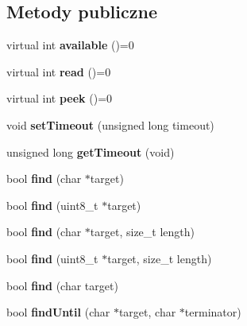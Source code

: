 \subsection*{Metody publiczne}
\begin{DoxyCompactItemize}
\item 
\mbox{\label{class_stream_a9c98a763395005c08ce95afb2f06c7b1}} 
virtual int {\bfseries available} ()=0
\item 
\mbox{\label{class_stream_aea5dee9fcb038148515b7c9212d38dc0}} 
virtual int {\bfseries read} ()=0
\item 
\mbox{\label{class_stream_a30c3c212ec6ea67277a708c5ea2501a5}} 
virtual int {\bfseries peek} ()=0
\item 
\mbox{\label{class_stream_a851dd6dc74d52389de04f99648478db5}} 
void {\bfseries set\+Timeout} (unsigned long timeout)
\item 
\mbox{\label{class_stream_abc982d9972a4c7fdabcf7ba9ab325ed1}} 
unsigned long {\bfseries get\+Timeout} (void)
\item 
\mbox{\label{class_stream_a4bab30ccd324efd461dee46a2339f673}} 
bool {\bfseries find} (char $\ast$target)
\item 
\mbox{\label{class_stream_a250f5e805979bad3efb0ef33038de457}} 
bool {\bfseries find} (uint8\+\_\+t $\ast$target)
\item 
\mbox{\label{class_stream_ad851401f2318cdb1de05707e021b81d9}} 
bool {\bfseries find} (char $\ast$target, size\+\_\+t length)
\item 
\mbox{\label{class_stream_abe254745b98af8037d10fef6126e42df}} 
bool {\bfseries find} (uint8\+\_\+t $\ast$target, size\+\_\+t length)
\item 
\mbox{\label{class_stream_a4f529a9d7309aedf535fb1a6757a5675}} 
bool {\bfseries find} (char target)
\item 
\mbox{\label{class_stream_ad1f5f6600832396fb38a897baf4de35b}} 
bool {\bfseries find\+Until} (char $\ast$target, char $\ast$terminator)

\end{DoxyCompactItemize}

